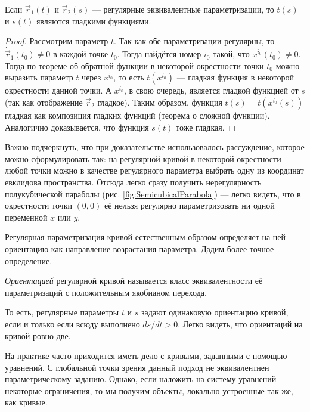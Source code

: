\begin{proposition} \label{proposition:SmoothHomeomorphism}
	Если $\vec{r}_1(t)$ и $\vec{r}_2(s)$ --- регулярные эквивалентные параметризации, то $t(s)$ и $s(t)$ являются гладкими функциями.
\end{proposition}

\begin{proof}
	Рассмотрим параметр $t$. Так как обе параметризации регулярны, то $\dot{\vec{r}}_1(t_0) \ne 0$ в каждой точке $t_0$. Тогда найдётся номер $i_0$ такой, что $\dot{x}^{i_0}(t_0) \ne 0$. Тогда по теореме об обратной функции в некоторой окрестности точки $t_0$ можно выразить параметр $t$ через $x^{i_0}$, то есть $t(x^{i_0})$ --- гладкая функция в некоторой окрестности данной точки. А $x^{i_0}$, в свою очередь, является гладкой функцией от $s$ (так как отображение $\vec{r}_2$ гладкое). Таким образом, функция $t(s) = t(x^{i_0}(s))$ гладкая как композиция гладких функций (теорема о сложной функции). Аналогично доказывается, что функция $s(t)$ тоже гладкая.
\end{proof}

Важно подчеркнуть, что при доказательстве использовалось рассуждение, которое можно сформулировать так: на регулярной кривой в некоторой окрестности любой точки можно в качестве регулярного параметра выбрать одну из координат евклидова пространства. Отсюда легко сразу получить нерегулярность полукубической параболы (рис. \ref{fig:SemicubicalParabola}) --- легко видеть, что в окрестности точки $(0, 0)$ её нельзя регулярно параметризовать ни одной переменной $x$ или $y$.

Регулярная параметризация кривой естественным образом определяет на ней ориентацию как направление возрастания параметра. Дадим более точное определение.

\begin{definition}
	\textit{Ориентацией} регулярной кривой называется класс эквивалентности её параметризаций с положительным якобианом перехода.
\end{definition}

То есть, регулярные параметры $t$ и $s$ задают одинаковую ориентацию кривой, если и только если всюду выполнено $ds / dt > 0$. Легко видеть, что ориентаций на кривой ровно две.

На практике часто приходится иметь дело с кривыми, заданными с помощью уравнений. С глобальной точки зрения данный подход не эквивалентнен параметрическому заданию. Однако, если наложить на систему уравнений некоторые ограничения, то мы получим объекты, локально устроенные так же, как кривые.

